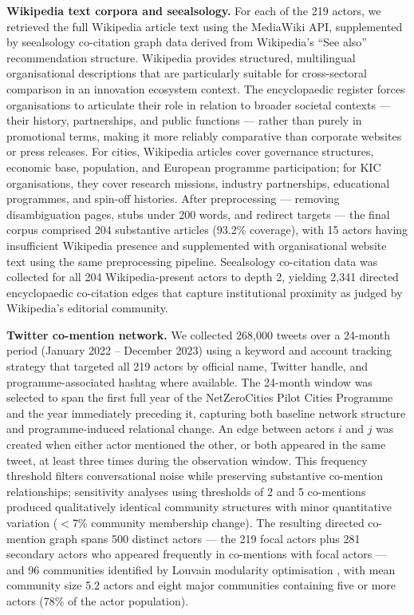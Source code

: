 \documentclass[review,12pt]{elsarticle}
\begin{document}
\textbf{Wikipedia text corpora and seealsology.} For each of the 219 actors, we retrieved the full Wikipedia article text using the MediaWiki API, supplemented by seealsology co-citation graph data derived from Wikipedia's ``See also'' recommendation structure. Wikipedia provides structured, multilingual organisational descriptions that are particularly suitable for cross-sectoral comparison in an innovation ecosystem context. The encyclopaedic register forces organisations to articulate their role in relation to broader societal contexts --- their history, partnerships, and public functions --- rather than purely in promotional terms, making it more reliably comparative than corporate websites or press releases. For cities, Wikipedia articles cover governance structures, economic base, population, and European programme participation; for KIC organisations, they cover research missions, industry partnerships, educational programmes, and spin-off histories. After preprocessing --- removing disambiguation pages, stubs under 200 words, and redirect targets --- the final corpus comprised 204 substantive articles (93.2\% coverage), with 15 actors having insufficient Wikipedia presence and supplemented with organisational website text using the same preprocessing pipeline. Seealsology co-citation data was collected for all 204 Wikipedia-present actors to depth 2, yielding 2{,}341 directed encyclopaedic co-citation edges that capture institutional proximity as judged by Wikipedia's editorial community.

\textbf{Twitter co-mention network.} We collected 268{,}000 tweets over a 24-month period (January 2022 -- December 2023) using a keyword and account tracking strategy that targeted all 219 actors by official name, Twitter handle, and programme-associated hashtag where available. The 24-month window was selected to span the first full year of the NetZeroCities Pilot Cities Programme and the year immediately preceding it, capturing both baseline network structure and programme-induced relational change. An edge between actors $i$ and $j$ was created when either actor mentioned the other, or both appeared in the same tweet, at least three times during the observation window. This frequency threshold filters conversational noise while preserving substantive co-mention relationships; sensitivity analyses using thresholds of 2 and 5 co-mentions produced qualitatively identical community structures with minor quantitative variation ($<$7\% community membership change). The resulting directed co-mention graph spans 500 distinct actors --- the 219 focal actors plus 281 secondary actors who appeared frequently in co-mentions with focal actors --- and 96 communities identified by Louvain modularity optimisation \citep{blondel2008fast}, with mean community size 5.2 actors and eight major communities containing five or more actors (78\% of the actor population).
\end{document}
